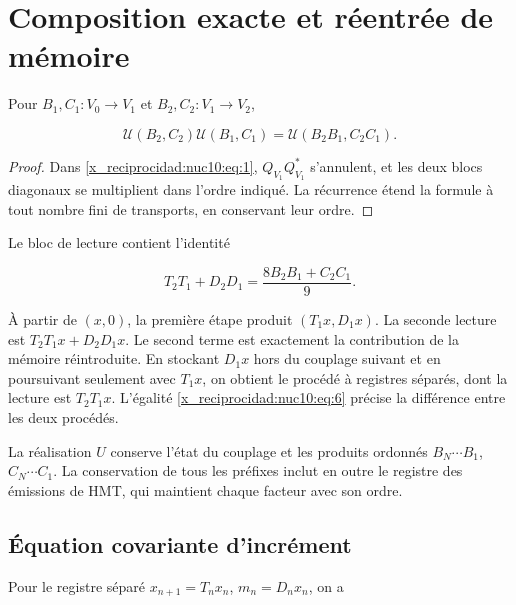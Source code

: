 \section{Composition exacte et réentrée de mémoire}

Pour \(B_1,C_1:V_0\to V_1\) et \(B_2,C_2:V_1\to V_2\),



\begin{equation}
\boxed{\mathcal U(B_2,C_2)\mathcal U(B_1,C_1)
=\mathcal U(B_2B_1,C_2C_1).}
\label{x_reciprocidad:nuc10:eq:5}
\end{equation}



\begin{proof}
Dans \eqref{x_reciprocidad:nuc10:eq:1}, \(Q_{V_1}Q_{V_1}^*\) s’annulent, et les deux blocs diagonaux se multiplient dans l’ordre indiqué. La récurrence étend la formule à tout nombre fini de transports, en conservant leur ordre.
\end{proof}

Le bloc de lecture contient l’identité



\begin{equation}
\boxed{T_2T_1+D_2D_1=\frac{8B_2B_1+C_2C_1}{9}.}
\label{x_reciprocidad:nuc10:eq:6}
\end{equation}



À partir de \((x,0)\), la première étape produit \((T_1x,D_1x)\). La seconde lecture est \(T_2T_1x+D_2D_1x\). Le second terme est exactement la contribution de la mémoire réintroduite. En stockant \(D_1x\) hors du couplage suivant et en poursuivant seulement avec \(T_1x\), on obtient le procédé à registres séparés, dont la lecture est \(T_2T_1x\). L’égalité \eqref{x_reciprocidad:nuc10:eq:6} précise la différence entre les deux procédés.

La réalisation \(U\) conserve l’état du couplage et les produits ordonnés \(B_N\cdots B_1\), \(C_N\cdots C_1\). La conservation de tous les préfixes inclut en outre le registre des émissions de HMT, qui maintient chaque facteur avec son ordre.

\subsection{Équation covariante d’incrément}

Pour le registre séparé \(x_{n+1}=T_nx_n\), \(m_n=D_nx_n\), on a



